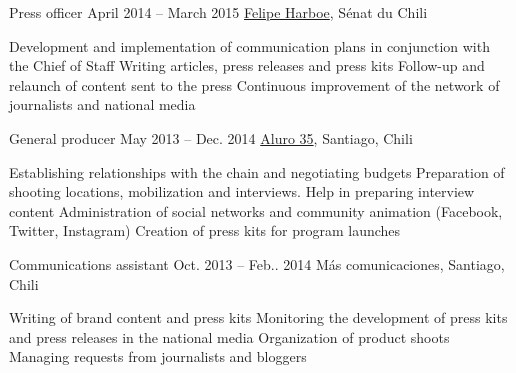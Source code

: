 %
%



\begin{joblist}




\item[Press officer]{April 2014 -- March 2015}
     { \href{https://www.harboe.cl/}{Felipe Harboe}, Sénat du Chili } 
	 {
			\iftbftiny \setlength{\parskip}{-10pt} \fi
			\begin{itemize}
			  \iftbftiny \setlength\itemsep{-3pt} \fi
			  \cvitem[\checkmark] Development and implementation of communication plans in conjunction with the Chief of Staff
			  \cvitem[\checkmark] Writing articles, press releases and press kits
			  \cvitem[\checkmark] Follow-up and relaunch of content sent to the press
			  \cvitem[\checkmark] Continuous improvement of the network of journalists and national media
			\end{itemize}     
	}
    
    
    
\item[General producer]{May 2013 -- Dec. 2014}
     {\href{https://www.aluro35.com/}  {Aluro 35}, Santiago, Chili}
     {	
			\iftbftiny \setlength{\parskip}{-10pt} \fi
			\begin{itemize}
			  \iftbftiny \setlength\itemsep{-3pt} \fi
			  \cvitem[\checkmark] Establishing relationships with the chain and negotiating budgets
			  \cvitem[\checkmark] Preparation of shooting locations, mobilization and interviews. Help in preparing interview content
			  \cvitem[\checkmark] Administration of social networks and community animation (Facebook, Twitter, Instagram)
			  \cvitem[\checkmark] Creation of press kits for program launches
			\end{itemize}     
	}



\item[Communications assistant]{Oct. 2013 -- Feb.. 2014 }     
  	{Más comunicaciones, Santiago, Chili}     
  	{
		\iftbftiny \setlength{\parskip}{-10pt} \fi
		\begin{itemize}
			  \iftbftiny \setlength\itemsep{-3pt} \fi
			  \cvitem[\checkmark] Writing of brand content and press kits
			  \cvitem[\checkmark] Monitoring the development of press kits and press releases in the national media
			  \cvitem[\checkmark] Organization of product shoots
			  \cvitem[\checkmark] Managing requests from journalists and bloggers
		\end{itemize}       
	}





\end{joblist}

